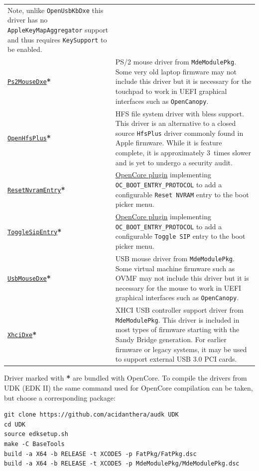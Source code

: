 \documentclass[]{article}
\begin{document}
\begin{longtable}{p{1.65in}p{5.25in}}
  Note, unlike \texttt{OpenUsbKbDxe} this driver has no \texttt{AppleKeyMapAggregator}
  support and thus requires \texttt{KeySupport} to be enabled. \\
\href{https://github.com/acidanthera/audk}{\texttt{Ps2MouseDxe}}\textbf{*}
& PS/2 mouse driver from \texttt{MdeModulePkg}. Some very old laptop firmware
  may not include this driver but it is necessary for the touchpad to work
  in UEFI graphical interfaces such as \texttt{OpenCanopy}. \\
\href{https://github.com/acidanthera/OpenCorePkg}{\texttt{OpenHfsPlus}}\textbf{*}
& HFS file system driver with bless support. This driver is an alternative to
  a closed source \texttt{HfsPlus} driver commonly found in Apple firmware. While
  it is feature complete, it is approximately 3~times slower and is yet to undergo
  a security audit. \\
\href{https://github.com/acidanthera/OpenCorePkg}{\texttt{ResetNvramEntry}}\textbf{*}
& \hyperref[uefiresetnvram]{OpenCore plugin} implementing \texttt{OC\_BOOT\_ENTRY\_PROTOCOL}
  to add a configurable \texttt{Reset NVRAM} entry to the boot picker menu. \\
\href{https://github.com/acidanthera/OpenCorePkg}{\texttt{ToggleSipEntry}}\textbf{*}
& \hyperref[uefitogglesip]{OpenCore plugin} implementing \texttt{OC\_BOOT\_ENTRY\_PROTOCOL}
  to add a configurable \texttt{Toggle SIP} entry to the boot picker menu. \\
\href{https://github.com/acidanthera/audk}{\texttt{UsbMouseDxe}}\textbf{*}
& USB mouse driver from \texttt{MdeModulePkg}. Some virtual machine firmware
  such as OVMF may not include this driver but it is necessary for the mouse to work
  in UEFI graphical interfaces such as \texttt{OpenCanopy}. \\
\href{https://github.com/acidanthera/audk}{\texttt{XhciDxe}}\textbf{*}
& XHCI USB controller support driver from \texttt{MdeModulePkg}. This driver is
  included in most types of firmware starting with the Sandy Bridge generation. For earlier firmware
  or legacy systems, it may be used to support external USB 3.0 PCI cards.
\end{longtable}

Driver marked with \textbf{*} are bundled with OpenCore.
To compile the drivers from UDK (EDK II) the same command used for
OpenCore compilation can be taken, but choose a corresponding package:
\begin{lstlisting}[label=compileudk, style=ocbash]
git clone https://github.com/acidanthera/audk UDK
cd UDK
source edksetup.sh
make -C BaseTools
build -a X64 -b RELEASE -t XCODE5 -p FatPkg/FatPkg.dsc
build -a X64 -b RELEASE -t XCODE5 -p MdeModulePkg/MdeModulePkg.dsc
\end{lstlisting}
\end{document}
